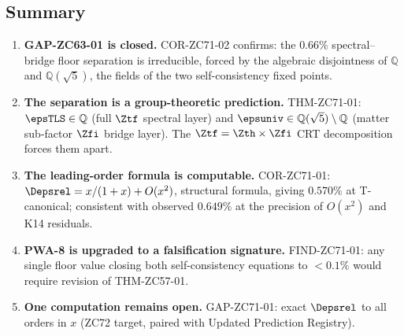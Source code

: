 \documentclass[12pt, a4paper]{article}
\begin{document}
\subsection{Summary}
\label{sec:summary}

\begin{enumerate}[leftmargin=*]

\item \textbf{GAP-ZC63-01 is closed.}
COR-ZC71-02 confirms: the $0.66\%$ spectral--bridge floor
separation is irreducible, forced by the algebraic disjointness
of $\mathbb{Q}$ and $\mathbb{Q}(\sqrt{5})$, the fields of the
two self-consistency fixed points.

\item \textbf{The separation is a group-theoretic prediction.}
THM-ZC71-01: $\epsTLS\in\mathbb{Q}$ (full $\Ztf$ spectral layer)
and $\epsuniv\in\mathbb{Q}(\sqrt{5})\setminus\mathbb{Q}$ (matter
sub-factor $\Zfi$ bridge layer).
The $\Ztf = \Zth\times\Zfi$ CRT decomposition forces them apart.

\item \textbf{The leading-order formula is computable.}
COR-ZC71-01: $\Depsrel = x/(1+x) + O(x^2)$, structural formula, giving $0.570\%$
at T-canonical; consistent with observed $0.649\%$ at the
precision of $O(x^2)$ and K14 residuals.

\item \textbf{PWA-8 is upgraded to a falsification signature.}
FIND-ZC71-01: any single floor value closing both self-consistency
equations to $<0.1\%$ would require revision of THM-ZC57-01.

\item \textbf{One computation remains open.}
GAP-ZC71-01: exact $\Depsrel$ to all orders in $x$ (ZC72 target,
paired with Updated Prediction Registry).

\end{enumerate}

\bigskip
\end{document}
